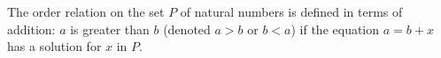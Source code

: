 The order relation on the set $P$ of natural numbers is defined in terms of addition: $a$ is greater than $b$ (denoted $a > b$ or $b < a$) if the equation $a = b + x$ has a solution for $x$ in $P$.

